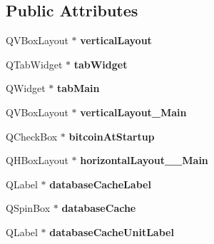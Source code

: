 \subsection*{Public Attributes}
\begin{DoxyCompactItemize}
\item 
\mbox{\label{class_ui___options_dialog_a1a73db5b8643c0fc144a954ea03023ed}} 
Q\+V\+Box\+Layout $\ast$ {\bfseries vertical\+Layout}
\item 
\mbox{\label{class_ui___options_dialog_a77a9d3769eb2e51c6df96768680ad3b1}} 
Q\+Tab\+Widget $\ast$ {\bfseries tab\+Widget}
\item 
\mbox{\label{class_ui___options_dialog_aeacc3e8260736efc2dfdc3454843f3e1}} 
Q\+Widget $\ast$ {\bfseries tab\+Main}
\item 
\mbox{\label{class_ui___options_dialog_a55d6de39b5acb3c75198afc32c9f08d9}} 
Q\+V\+Box\+Layout $\ast$ {\bfseries vertical\+Layout\+\_\+\+Main}
\item 
\mbox{\label{class_ui___options_dialog_a4d8919915bd1937ef6cab315c32fa591}} 
Q\+Check\+Box $\ast$ {\bfseries bitcoin\+At\+Startup}
\item 
\mbox{\label{class_ui___options_dialog_a959bcef335774abf79cb9b13466093c1}} 
Q\+H\+Box\+Layout $\ast$ {\bfseries horizontal\+Layout\+\_\+\_\+\+Main}
\item 
\mbox{\label{class_ui___options_dialog_a84c2dd7a51cf0636566e40c64883fa84}} 
Q\+Label $\ast$ {\bfseries database\+Cache\+Label}
\item 
\mbox{\label{class_ui___options_dialog_a46e9e458834f02c35a84a8e95d5c682e}} 
Q\+Spin\+Box $\ast$ {\bfseries database\+Cache}
\item 
\mbox{\label{class_ui___options_dialog_a3f4a0ec257e569a214cde0cf1d3075d5}} 
Q\+Label $\ast$ {\bfseries database\+Cache\+Unit\+Label}
\item 
\mbox{\label{class_ui___options_dialog_a56ab26a117830d3f19de69ea5b62a49c}} 

\end{DoxyCompactItemize}

